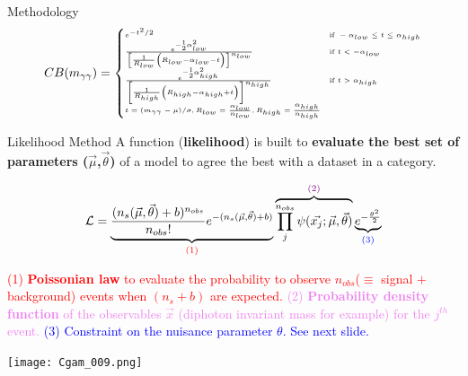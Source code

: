 \begin{frame}{Methodology}
    \begin{equation}
      \tiny
      CB(m_{\gamma \gamma}) = 
      \begin{cases}
        e^{-t^{2}/2} & \text{if } -\alpha_{low} \leq t \leq \alpha_{high} \\
        \frac{ e^{-{}^{1}_{2} \alpha_{low}^{2}} } { \left[ \frac{1}{R_{low}} \left(R_{low} - \alpha_{low} - t \right) \right]^{n_{low}} } & \text{if } t < -\alpha_{low} \\
        \frac{ e^{-{}^{1}_{2} \alpha_{high}^{2}} } { \left[ \frac{1}{R_{high}} \left(R_{high} - \alpha_{high} + t \right) \right]^{n_{high}} } & \text{if } t > \alpha_{high} \\
        t=(m_{\gamma\gamma}-\mu)/\sigma, R_{low}=\frac{\alpha_{low}}{n_{low}},  R_{high}=\frac{\alpha_{high}}{n_{high}} \\
      \end{cases}
    \end{equation}

\end{frame}

\begin{frame}{Likelihood Method}
A function ({\bf likelihood}) is built to {\bf evaluate the best set of parameters ($\vec{\mu}$,$\vec{\theta}$)} of a model to agree the best with a dataset in a category.

$$\mathcal{L}=\underbrace{\frac{(n_{s}(\vec{\mu},\vec{\theta})+b)^{n_{obs}}}{n_{obs}!} e^{-(n_{s}(\vec{\mu},\vec{\theta})+b)}}_{\textcolor{red}{\text{(1)}}}  \overbrace{\prod_j^{n_{obs}}\psi(\vec{x_j};\vec{\mu},\vec{\theta})}^{\textcolor{violet}{\text{(2)}}} \underbrace{e^{-\frac{\theta^2}{2}}}_{\textcolor{blue}{\text{(3)}}}$$
\vfill
\begin{minipage}{0.49\linewidth}
\textcolor{red}{(1) {\bf Poissonian law} to evaluate the probability to observe $n_{obs}$($\equiv$ signal $+$ background) events when $(n_s+b)$ are expected.}\newline
\textcolor{violet}{(2) {\bf Probability density function} of the observables $\vec{x}$ (diphoton invariant mass for example) for the $j^{th}$ event.}\newline
\textcolor{blue}{(3) Constraint on the nuisance parameter $\theta$. See next slide.}\newline
\end{minipage}
\begin{minipage}{0.49\linewidth}
\texttt{[image: Cgam\_009.png]}
\end{minipage}
\end{frame}


